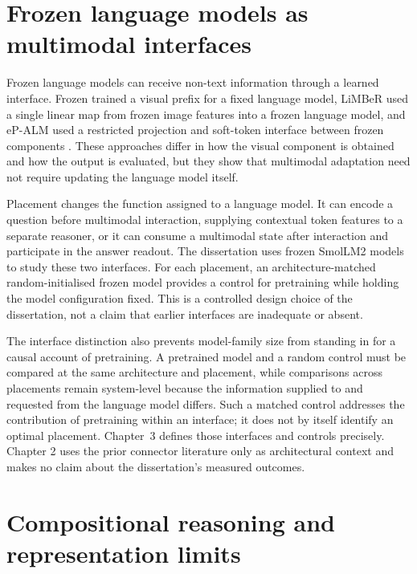 \section{Frozen language models as multimodal interfaces}
\label{sec:ch2-lm-interfaces}

Frozen language models can receive non-text information through a learned interface. Frozen trained a visual prefix for a fixed language model, LiMBeR used a single linear map from frozen image features into a frozen language model, and eP-ALM used a restricted projection and soft-token interface between frozen components \citep{tsimpoukelli2021frozen,merullo2023limber,shukor2023epalm}. These approaches differ in how the visual component is obtained and how the output is evaluated, but they show that multimodal adaptation need not require updating the language model itself.

Placement changes the function assigned to a language model. It can encode a question before multimodal interaction, supplying contextual token features to a separate reasoner, or it can consume a multimodal state after interaction and participate in the answer readout. The dissertation uses frozen SmolLM2 models \citep{benallal2025smollm2} to study these two interfaces.
For each placement, an architecture-matched random-initialised frozen model provides a control for pretraining while holding the model configuration fixed. This is a controlled design choice of the dissertation, not a claim that earlier interfaces are inadequate or absent.

The interface distinction also prevents model-family size from standing in for a causal account of pretraining. A pretrained model and a random control must be compared at the same architecture and placement, while comparisons across placements remain system-level because the information supplied to and requested from the language model differs. Such a matched control addresses the contribution of pretraining within an interface; it does not by itself identify an optimal placement. Chapter~3 defines those interfaces and controls precisely. Chapter 2 uses the prior connector literature only as architectural context and makes no claim about the dissertation's measured outcomes.

\section{Compositional reasoning and representation limits}
\label{sec:ch2-composition}

